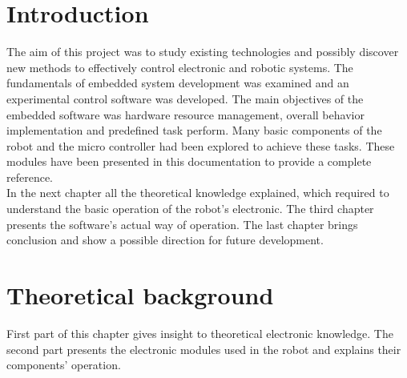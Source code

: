 \documentclass[11pt,a4paper,oneside,article]{memoir}
\begin{document}
\newpage

\pagestyle{plain}

\setcounter{page}{1} %

\chapter{Introduction}
The aim of this project was to study existing technologies and possibly discover new methods to effectively control electronic and robotic systems. The fundamentals of embedded system development was examined and an experimental control software was developed. The main objectives of the embedded software was hardware resource management, overall behavior implementation and predefined task perform. Many basic components of the robot and the micro controller had been explored to achieve these tasks. These modules have been presented in this documentation to provide a complete reference.\\
In the next chapter all the theoretical knowledge explained, which required to understand the basic operation of the robot's electronic. The third chapter presents the software's actual way of operation. The last chapter brings conclusion and show a possible direction for future development.

\chapter{Theoretical background}
First part of this chapter gives insight to theoretical electronic knowledge. The second part presents the electronic modules used in the robot and explains their components' operation.
\end{document}
